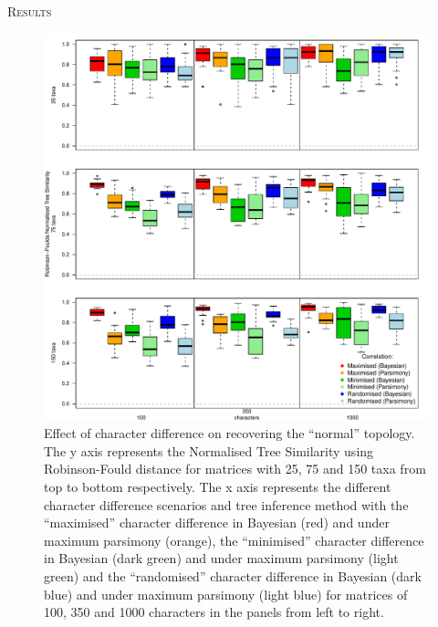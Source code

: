 \documentclass[12pt,letterpaper]{article}
\renewcommand{\section}[1]{%
\bigskip
\begin{center}
\begin{Large}
\normalfont\scshape #1
\medskip
\end{Large}
\end{center}}
\begin{document}
\section{Results}

\begin{figure}[!htbp]
\centering
   \includegraphics[width=1\textwidth]{Figures/RF_results_best.pdf}
\caption{\small{Effect of character difference on recovering the ``normal'' topology. The y axis represents the Normalised Tree Similarity using Robinson-Fould distance for matrices with 25, 75 and 150 taxa from top to bottom respectively. The x axis represents the different character difference scenarios and tree inference method with the ``maximised'' character difference in Bayesian (red) and under maximum parsimony (orange), the ``minimised'' character difference in Bayesian (dark green) and under maximum parsimony (light green) and the ``randomised'' character difference in Bayesian (dark blue) and under maximum parsimony (light blue) for matrices of 100, 350 and 1000 characters in the panels from left to right.}}
\label{Fig:RF_results_best}
\end{figure}
\end{document}
